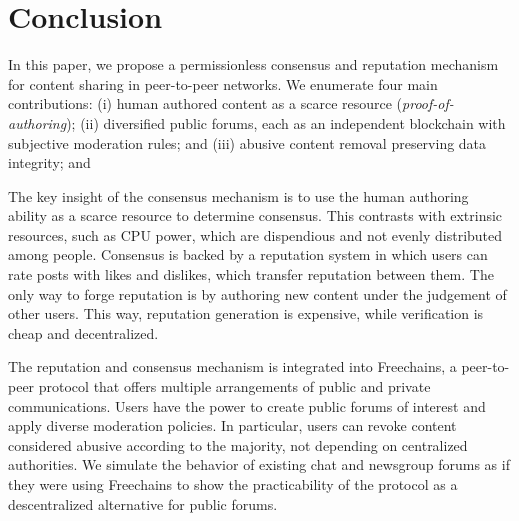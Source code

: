 \documentclass[12pt]{article}
\newcommand{\FC}       {Freechains\xspace}
\begin{document}
\section{Conclusion}
\label{sec.conclusion}

In this paper, we propose a permissionless consensus and reputation mechanism
for content sharing in peer-to-peer networks.
We enumerate four main contributions:
    (i)   human authored content as a scarce resource
          (\emph{proof-of-authoring});
    (ii)  diversified public forums, each as an independent blockchain with
          subjective moderation rules; and
    (iii) abusive content removal preserving data integrity; and

The key insight of the consensus mechanism is to use the human authoring
ability as a scarce resource to determine consensus.
This contrasts with extrinsic resources, such as CPU power, which are
dispendious and not evenly distributed among people.
%
Consensus is backed by a reputation system in which users can rate posts with
likes and dislikes, which transfer reputation between them.
The only way to forge reputation is by authoring new content under the
judgement of other users.
This way, reputation generation is expensive, while verification is cheap and
decentralized.

The reputation and consensus mechanism is integrated into \FC, a peer-to-peer
protocol that offers multiple arrangements of public and private
communications.
Users have the power to create public forums of interest and apply diverse
moderation policies.
In particular, users can revoke content considered abusive according to the
majority, not depending on centralized authorities.
%
We simulate the behavior of existing chat and newsgroup forums as if they were
using \FC to show the practicability of the protocol as a descentralized
alternative for public forums.
\end{document}
